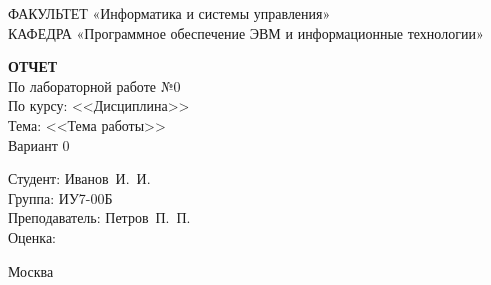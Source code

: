 \begin{titlepage}
	{\doublespacing \small \raggedright ФАКУЛЬТЕТ \hspace{25mm} «Информатика и системы управления»\\
	КАФЕДРА \hspace{5mm} «Программное обеспечение ЭВМ и информационные технологии»\\}

	\vspace{30mm}
	
	\textbf{ОТЧЕТ}\\
	По лабораторной работе №0\\
	По курсу: <<Дисциплина>>\\
	Тема: <<Тема работы>>\\
	Вариант 0\\

	\vspace{60mm}

	\hspace{70mm} Студент:       \hfill Иванов~И.~И.\\
	\hspace{70mm} Группа:        \hfill ИУ7-00Б\\
	\hspace{70mm} Преподаватель: \hfill Петров~П.~П.\\
	\hspace{70mm} Оценка:        \hfill \hrulefill\\

	\vfill
	
	Москва\\
	\the\year
\end{titlepage}

\setcounter{page}{2}